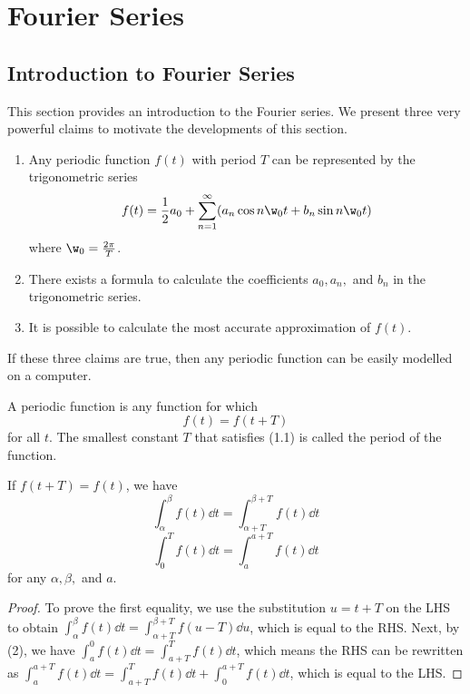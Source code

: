 

\section{Fourier Series}

\subsection{Introduction to Fourier Series}

This section provides an introduction to the Fourier series. We present three very powerful claims to motivate the developments of this section.

\begin{bclaim}
\begin{enumerate}
	\item Any periodic function $f(t)$ with period $T$ can be represented by the trigonometric series
$$f(t)=\frac{1}{2} a_0+\sum_{n=1}^\infty (a_n\cos n\w_0t+b_n\sin n\w_0t)$$ where $\w_0=\frac{2\pi}{T}$.
	\item There exists a formula to calculate the coefficients $a_0,a_n,$ and $b_n$ in the trigonometric series.
	\item It is possible to calculate the most accurate approximation of $f(t)$.
\end{enumerate}
\end{bclaim}

If these three claims are true, then any periodic function can be easily modelled on a computer.

\begin{defn} A periodic function is any function for which  \begin{equation} f(t) = f(t+T)
\end{equation} for all $t$. The smallest constant $T$ that satisfies (1.1) is called the period of the function.
\end{defn}

\begin{coro} If $f(t+T)=f(t)$, we have \begin{equation}
\int_\alpha^\beta f(t)\dd{t}=\int_{\alpha+T}^{\beta+T} f(t)\dd{t}
\end{equation} \begin{equation}
\int_0^T f(t)\dd{t}=\int_a^{a+T}f(t)\dd{t}
\end{equation} for any $\alpha,\beta,$ and $a$. \end{coro}

\begin{proof} To prove the first equality, we use the substitution $u=t+T$ on the LHS to obtain $\int_\alpha^\beta f(t)\dd{t}=\int_{\alpha+T}^{\beta+T} f(u-T)\dd{u}$, which is equal to the RHS. Next, by (2), we have $\int_a^0f(t)\dd{t}=\int_{a+T}^Tf(t)\dd{t}$, which means the RHS can be rewritten as $\int_a^{a+T}f(t)\dd{t}=\int_{a+T}^Tf(t)\dd{t}+\int_0^{a+T}f(t)\dd{t}$, which is equal to the LHS. \end{proof}

